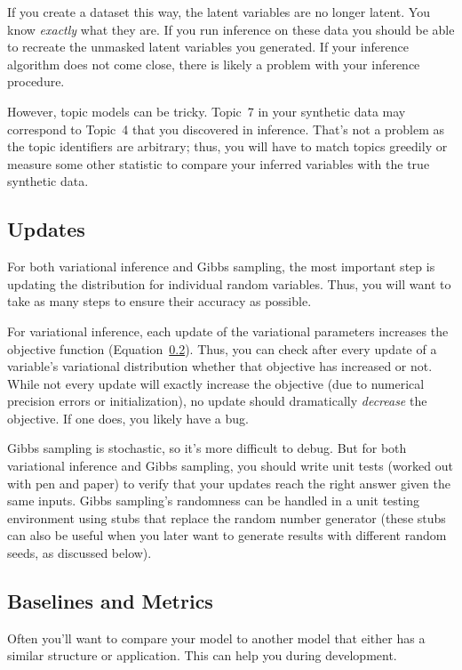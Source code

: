 If you create a dataset this way, the latent variables are no longer
latent.  You know \emph{exactly} what they are.  If you run inference
on these data you should be able to recreate the unmasked latent
variables you generated.  If your inference algorithm does not come
close, there is likely a problem with your inference procedure.

However, topic models can be tricky.  Topic~7 in your synthetic data
may correspond to Topic~4 that you discovered in inference.  That's
not a problem as the topic identifiers are arbitrary; thus, you will
have to match topics greedily or measure some other statistic to
compare your inferred variables with the true synthetic data.

\subsection{Updates}

For both variational inference and Gibbs sampling, the most important
step is updating the distribution for individual random variables.
Thus, you will want to take as many steps to ensure their accuracy as
possible.

For variational inference, each update of the variational parameters
increases the objective function (Equation~\ref{}).  Thus, you can
check after every update of a variable's variational distribution
whether that objective has increased or not.  While not every update
will exactly increase the objective (due to numerical precision errors or
initialization), no update should dramatically \emph{decrease} the
objective.  If one does, you likely have a bug.

Gibbs sampling is stochastic, so it's more difficult to debug.  But
for both variational inference and Gibbs sampling, you should write
unit tests (worked out with pen and paper) to verify that your updates
reach the right answer given the same inputs.  Gibbs sampling's
randomness can be handled in a unit testing environment using stubs
that replace the random number generator (these stubs can also be
useful when you later want to generate results with different random
seeds, as discussed below).

\subsection{Baselines and Metrics}

Often you'll want to compare your model to another model that either
has a similar structure or application.  This can help you during
development.

